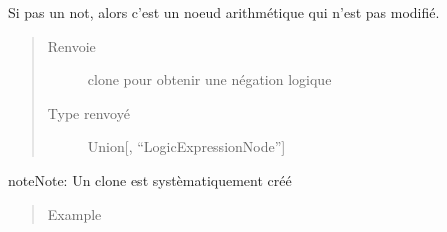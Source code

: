 \documentclass[letterpaper,10pt,french]{sphinxmanual}
\begin{document}
\begin{fulllineitems}
\begin{fulllineitems}
Si pas un not, alors c’est un noeud arithmétique qui n’est pas modifié.
\begin{quote}\begin{description}
\item[{Renvoie}] \leavevmode
clone pour obtenir une négation logique

\item[{Type renvoyé}] \leavevmode
Union{[}{\hyperref[\detokenize{comparaisonexpressionnodes:comparaisonexpressionnodes.ComparaisonExpressionNode}]{}}, “LogicExpressionNode”{]}

\end{description}\end{quote}

\begin{sphinxadmonition}{note}{Note:}
Un clone est systèmatiquement créé
\end{sphinxadmonition}
\begin{quote}\begin{description}
\item[{Example}] \leavevmode
\begin{sphinxVerbatim}[commandchars=\\\{\}]
   
   
   
  
  
    
  
  
\end{sphinxVerbatim}


\end{description}
\end{quote}
\end{fulllineitems}
\end{fulllineitems}
\end{document}
